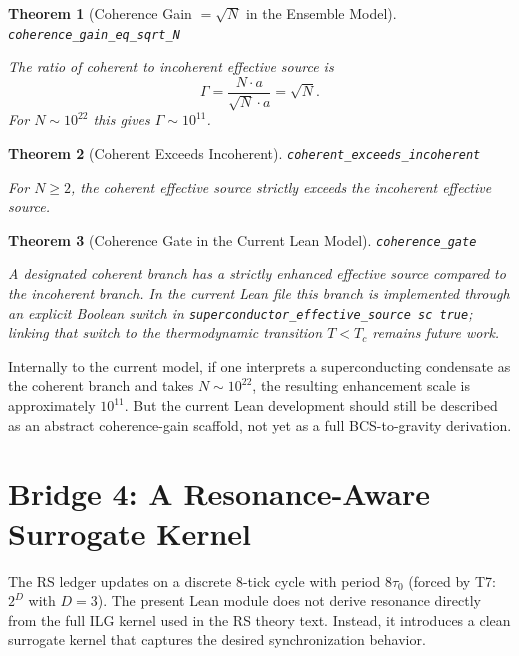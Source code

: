 \documentclass[11pt,a4paper]{article}
\newtheorem{theorem}{Theorem}[section]
\newcommand{\lean}[1]{\texttt{\small #1}}
\begin{document}
\begin{theorem}[Coherence Gain $= \sqrt{N}$ in the Ensemble Model]
\label{thm:gain}
\lean{coherence\_gain\_eq\_sqrt\_N}

The ratio of coherent to incoherent effective source is
\begin{equation}
    \Gamma = \frac{N \cdot a}{\sqrt{N} \cdot a} = \sqrt{N}.
\end{equation}
For $N \sim 10^{22}$ this gives $\Gamma \sim 10^{11}$.
\end{theorem}

\begin{theorem}[Coherent Exceeds Incoherent]
\lean{coherent\_exceeds\_incoherent}

For $N \geq 2$, the coherent effective source strictly exceeds the incoherent effective source.
\end{theorem}

\begin{theorem}[Coherence Gate in the Current Lean Model]
\lean{coherence\_gate}

A designated coherent branch has a strictly enhanced effective source compared to the incoherent branch.
In the current Lean file this branch is implemented through an explicit Boolean switch in
\lean{superconductor\_effective\_source sc true};
linking that switch to the thermodynamic transition $T < T_c$ remains future work.
\end{theorem}

\noindent Internally to the current model, if one interprets a superconducting condensate as the coherent branch and takes $N \sim 10^{22}$, the resulting enhancement scale is approximately $10^{11}$.
But the current Lean development should still be described as an abstract coherence-gain scaffold, not yet as a full BCS-to-gravity derivation.

\section{Bridge 4: A Resonance-Aware Surrogate Kernel}
\label{sec:gap4}

The RS ledger updates on a discrete 8-tick cycle with period $8\tau_0$ (forced by T7: $2^D$ with $D=3$).
The present Lean module does not derive resonance directly from the full ILG kernel used in the RS theory text.
Instead, it introduces a clean surrogate kernel that captures the desired synchronization behavior.
\end{document}
